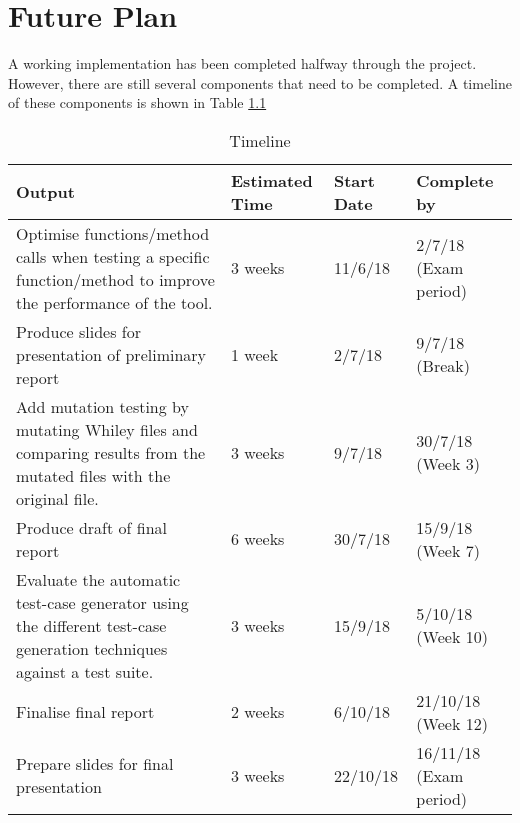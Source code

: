 \chapter{Future Plan}\label{chapter:future}


A working implementation has been completed halfway through the project. However, there are still several components that need to be completed.
A timeline of these components is shown in Table \ref{table:timeline}

\begin{table}[H]
	  \centering
\begin{tabular}{ |p{10cm}|p{2cm}|p{2cm}|p{2cm}| }
\hline
\textbf{Output} & \textbf{Estimated Time} & \textbf{Start Date} & \textbf{Complete by}\\
\hline
Optimise functions/method calls when testing a specific function/method to improve the performance of the tool. & 3 weeks & 11/6/18 & 2/7/18 (Exam period) \\
\hline
Produce slides for presentation of preliminary report & 1 week & 2/7/18 & 9/7/18 (Break)\\
\hline
Add mutation testing by mutating Whiley files and comparing results from the mutated files with the original file. & 3 weeks & 9/7/18 & 30/7/18 (Week 3)\\
\hline
Produce draft of final report & 6 weeks & 30/7/18 & 15/9/18 (Week 7)\\
\hline
Evaluate the automatic test-case generator using the different test-case generation techniques against a test suite. & 3 weeks & 15/9/18 & 5/10/18 (Week 10) \\
\hline
Finalise final report & 2 weeks & 6/10/18 & 21/10/18 (Week 12) \\
\hline
Prepare slides for final presentation & 3 weeks & 22/10/18 & 16/11/18 (Exam period)\\
\hline
\end{tabular}

\caption{Timeline}
\label{table:timeline}

\end{table}

